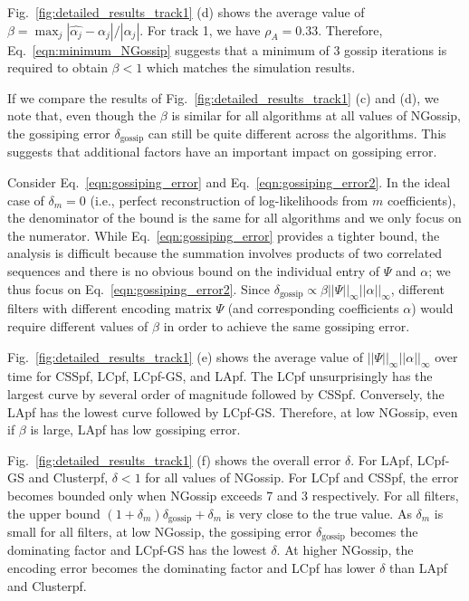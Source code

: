 \documentclass[10pt,letterpaper,final]{article}
\begin{document}
Fig.~\ref{fig:detailed_results_track1} (d) shows the average value of $\beta = \max_j|\hat{\alpha_j}-\alpha_j|/|\alpha_j|$. For track 1, we have $\rho_A=0.33$. Therefore, Eq.~\eqref{eqn:minimum_NGossip} suggests that a minimum of 3 gossip iterations is required to obtain $\beta<1$ which matches the simulation results. 

If we compare the results of Fig.~\ref{fig:detailed_results_track1} (c) and (d), we note that, even though the $\beta$ is similar for all algorithms at all values of NGossip, the gossiping error $\delta_{\text{gossip}}$ can still be quite different across the algorithms. This suggests that additional factors have an important impact on gossiping error. 

Consider Eq.~\eqref{eqn:gossiping_error} and Eq.~\eqref{eqn:gossiping_error2}. In the ideal case of $\delta_m=0$ (i.e., perfect reconstruction of log-likelihoods from $m$ coefficients), the denominator of the bound is the same for all algorithms and we only focus on the numerator. While Eq.~\eqref{eqn:gossiping_error} provides a tighter bound, the analysis is difficult because the summation involves products of two correlated sequences and there is no obvious bound on the individual entry of $\Psi$ and $\alpha$; we thus focus on Eq.~\eqref{eqn:gossiping_error2}. Since $\delta_{\text{gossip}}\propto \beta||\Psi||_\infty||\alpha||_\infty$, different filters with different encoding matrix $\Psi$ (and corresponding coefficients $\alpha$) would require different values of $\beta$ in order to achieve the same gossiping error. 

Fig.~\ref{fig:detailed_results_track1} (e) shows the average value of $||\Psi||_\infty||\alpha||_\infty$ over time for CSSpf, LCpf, LCpf-GS, and LApf. The LCpf unsurprisingly has the largest curve by several order of magnitude followed by CSSpf. Conversely, the LApf has the lowest curve followed by LCpf-GS. Therefore, at low NGossip, even if $\beta$ is large, LApf has low gossiping error. 

Fig.~\ref{fig:detailed_results_track1} (f) shows the overall error $\delta$. For LApf, LCpf-GS and Clusterpf, $\delta<1$ for all values of NGossip. For LCpf and CSSpf, the error becomes bounded only when NGossip exceeds 7 and 3 respectively. For all filters, the upper bound $(1+\delta_m)\delta_{\text{gossip}}+\delta_m$ is very close to the true value. As $\delta_m$ is small for all filters, at low NGossip, the gossiping error $\delta_{\text{gossip}}$ becomes the dominating factor and LCpf-GS has the lowest $\delta$. At higher NGossip, the encoding error becomes the dominating factor and LCpf has lower $\delta$ than LApf and Clusterpf. 
\end{document}
